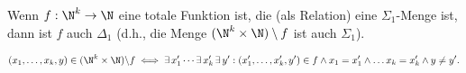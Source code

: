 
\begin{exercise}[220]

\phantom{}
	Wenn $f: \N^k \to \N$ eine totale Funktion ist, die (als Relation) eine $\Sigma_1$-Menge ist, dann ist $f$ auch $\Delta_1$ (d.h., die Menge $(\N^k \times \N) \setminus f$ ist auch $\Sigma_1$).

\end{exercise}


\begin{solution}

\begin{align*}
	(x_1,\dots,x_k,y) \in (\N^k \times \N)\backslash f \iff
	\exists\, x^{\prime}_1 \cdots \exists\, x^{\prime}_k\, \exists\, y^{\prime}:
	(x^{\prime}_1,\dots,x^{\prime}_k,y^{\prime}) \in f \land x_1 = x^{\prime}_1
	\land \dots x_k = x^{\prime}_k \land y \neq y^{\prime}.
\end{align*}

\end{solution}
